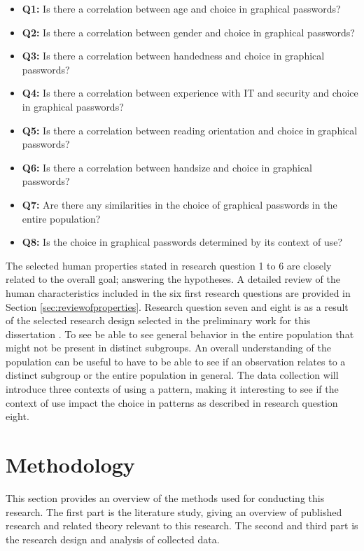     {\renewcommand\labelitemi{}
      \begin{itemize}[leftmargin=*]
        \item {\bf Q1:} Is there a correlation between age and choice in graphical passwords?
        \item {\bf Q2:} Is there a correlation between gender and choice in graphical passwords?
        \item {\bf Q3:} Is there a correlation between handedness and choice in graphical passwords?
        \item {\bf Q4:} Is there a correlation between experience with IT and security and choice in graphical passwords?
        \item {\bf Q5:} Is there a correlation between reading orientation and choice in graphical passwords?
        \item {\bf Q6:} Is there a correlation between handsize and choice in graphical passwords?
        \item {\bf Q7:} Are there any similarities in the choice of graphical passwords in the entire population?
        \item {\bf Q8:} Is the choice in graphical passwords determined by its context of use?
      \end{itemize}
    }

    The selected human properties stated in research question 1 to 6 are closely related to the overall goal; answering the hypotheses. A detailed review of the human characteristics included in the six first research questions are provided in Section \ref{sec:reviewofproperties}. Research question seven and eight is as a result of the selected research design selected in the preliminary work for this dissertation \cite{prosjektoppgave}. To see be able to see general behavior in the entire population that might not be present in distinct subgroups. An overall understanding of the population can be useful to have to be able to see if an observation relates to a distinct subgroup or the entire population in general. The data collection will introduce three contexts of using a pattern, making it interesting to see if the context of use impact the choice in patterns as described in research question eight.

  \clearpage
  \section{Methodology} \label{sec:researchmethods}
    This section provides an overview of the methods used for conducting this research. The first part is the literature study, giving an overview of published research and related theory relevant to this research. The second and third part is the research design and analysis of collected data.

